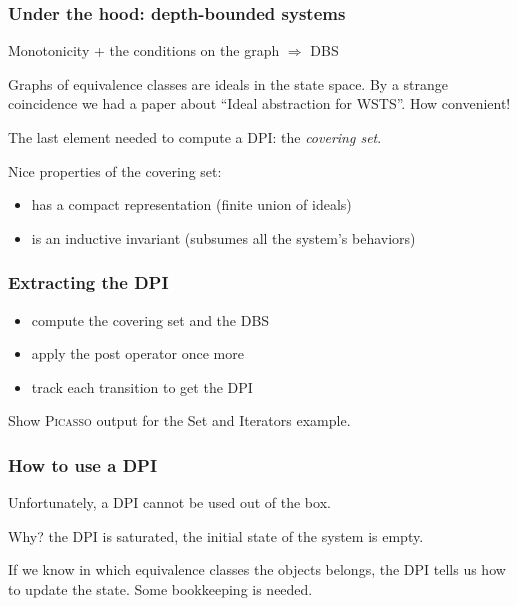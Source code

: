 \documentclass{beamer}
\newcommand{\picasso}{\textsc{Picasso}\xspace}
\begin{document}
\begin{frame}
  \frametitle{Under the hood: depth-bounded systems}

  Monotonicity + the conditions on the graph $\Rightarrow$ DBS

  \vspace{3ex}

  Graphs of equivalence classes are ideals in the state space.
  By a strange coincidence we had a paper about ``Ideal abstraction for WSTS''.
  How convenient!

  \vspace{3ex}

  The last element needed to compute a DPI: the \emph{covering set}.
  
  \vspace{1ex}

  Nice properties of the covering set:
  \begin{itemize}
  \item has a compact representation (finite union of ideals)
  \item is an inductive invariant (subsumes all the system's behaviors)
  \end{itemize}
\end{frame}

\begin{frame}
  \frametitle{Extracting the DPI}
  \begin{itemize}
  \item compute the covering set and the DBS
  \item apply the post operator once more
  \item track each transition to get the DPI
  \end{itemize}

  \vspace{2ex}

  Show \picasso output for the Set and Iterators example.
\end{frame}

\begin{frame}
  \frametitle{How to use a DPI}

  Unfortunately, a DPI cannot be used out of the box.

  Why? the DPI is \alert{saturated}, the initial state of the system is \alert{empty}.

  \vspace{2ex}

  
  If we know in which equivalence classes the objects belongs, the DPI tells us how to update the state.
  Some bookkeeping is needed.

\end{frame}
\end{document}
